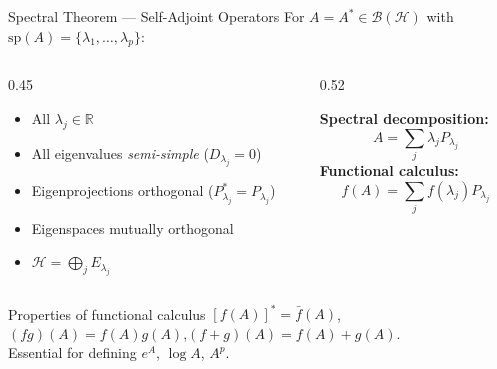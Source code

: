 \documentclass{beamer}
\newcommand{\Hilb}{\mathcal{H}}
\newcommand{\Bound}{\mathcal{B}}
\newcommand{\Spec}{\mathrm{sp}}
\begin{document}
\begin{frame}[shrink=10]{Spectral Theorem --- Self-Adjoint Operators}
  For $A=A^*\in\Bound(\Hilb)$ with $\Spec(A)=\{\lambda_1,\dots,\lambda_p\}$:

  \begin{columns}[T]
    \begin{column}{0.45\textwidth}
      \begin{itemize}
        \item All $\lambda_j\in\mathbb{R}$
        \item All eigenvalues \emph{semi-simple} ($D_{\lambda_j}=0$)
        \item Eigenprojections orthogonal ($P_{\lambda_j}^*=P_{\lambda_j}$)
        \item Eigenspaces mutually orthogonal
        \item $\Hilb = \bigoplus_j E_{\lambda_j}$
      \end{itemize}
    \end{column}
    \begin{column}{0.52\textwidth}
      \begin{tcolorbox}[mathbox]
        \textbf{Spectral decomposition:}
        \[ A = \sum_j \lambda_j P_{\lambda_j} \]
        \textbf{Functional calculus:}
        \[ f(A) = \sum_j f(\lambda_j) P_{\lambda_j} \]
      \end{tcolorbox}
    \end{column}
  \end{columns}

  \vspace{0.4em}
  \begin{block}{Properties of functional calculus}
    $[f(A)]^* = \bar f(A)$,\quad $(fg)(A)=f(A)g(A)$,\quad $(f+g)(A)=f(A)+g(A)$.\\
    \smallskip
    Essential for defining $e^A$, $\log A$, $A^p$.
  \end{block}
\end{frame}
\end{document}
